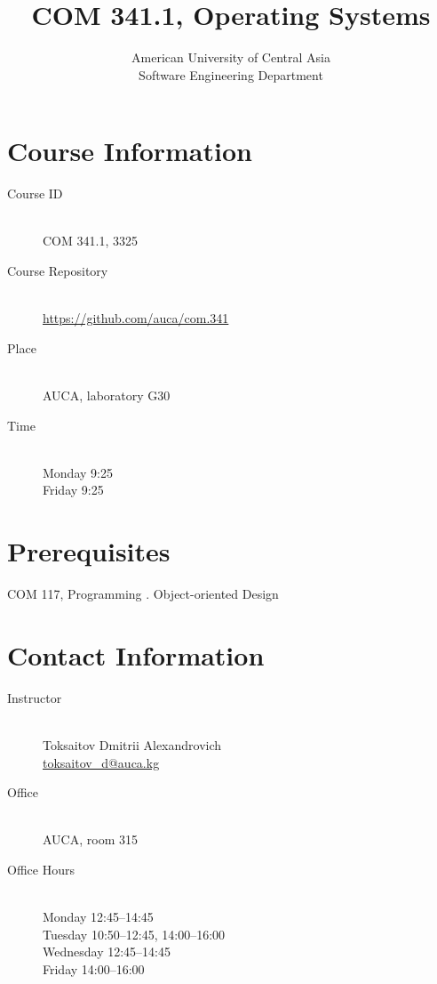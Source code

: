 \documentclass[12pt,a4paper,oneside]{article}
\newcommand{\R}[1]{\uppercase\expandafter{\romannumeral #1\relax}}
\begin{document}
    \title{COM 341.1, Operating Systems}
    \author{
        American University of Central Asia\\
        Software Engineering Department
    }
    \date{}
    \maketitle

    \section{Course Information}

        \begin{description}
            \item[Course ID]\hfill\\
                COM 341.1, 3325
            \item[Course Repository]\hfill\\
                \url{https://github.com/auca/com.341}
            \item[Place]\hfill\\
                AUCA, laboratory G30
            \item[Time]\hfill\\
                Monday 9:25\\
                Friday 9:25
        \end{description}

    \section{Prerequisites}

        COM 117, Programming \R{2}. Object-oriented Design

    \section{Contact Information}

        \begin{description}
            \item[Instructor]\hfill\\
                Toksaitov Dmitrii Alexandrovich\\
                \href{mailto:toksaitov_d@auca.kg}{toksaitov\_d@auca.kg}
            \item[Office]\hfill\\
                AUCA, room 315
            \item[Office Hours]\hfill\\
                Monday 12:45--14:45\\
                Tuesday 10:50--12:45, 14:00--16:00\\
                Wednesday 12:45--14:45\\
                Friday 14:00--16:00
        \end{description}
\end{document}
